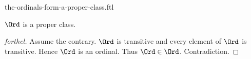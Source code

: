 \documentclass{naproche-library}
\begin{document}
\begin{smodule}[title=The Ordinals Form a Proper Class -- Burali-Forti's Paradox]{the-ordinals-form-a-proper-class.ftl}
  
\begin{theorem}[forthel,title=Burali-Forti's Paradox,id=burali_forti_paradox]
  $\Ord$ is a proper class.
\end{theorem}
\begin{proof}[forthel]
  Assume the contrary.
  $\Ord$ is transitive and every element of $\Ord$ is transitive.
  Hence $\Ord$ is an ordinal.
  Thus $\Ord \in \Ord$.
  Contradiction.
\end{proof}
\end{smodule}
\end{document}
